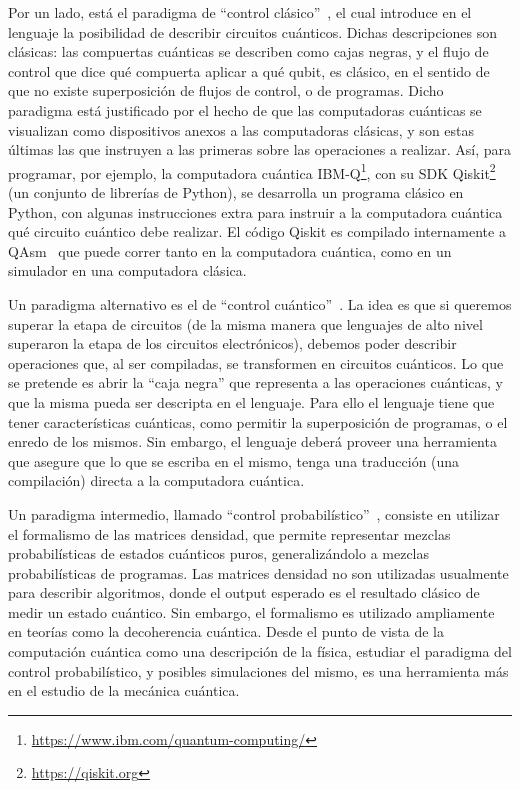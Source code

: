\documentclass[a4paper]{article}
\begin{document}
Por un lado, está el paradigma de ``control clásico''~\cite{SelingerMSCS04}, el
cual introduce en el lenguaje la posibilidad de describir circuitos cuánticos.
Dichas descripciones son clásicas: las compuertas cuánticas se describen como
cajas negras, y el flujo de control que dice qué compuerta aplicar a qué qubit,
es clásico, en el sentido de que no existe superposición de flujos de control, o
de programas. Dicho paradigma está justificado por el hecho de que las
computadoras cuánticas se visualizan como dispositivos anexos a las computadoras
clásicas, y son estas últimas las que instruyen a las primeras sobre las
operaciones a realizar. Así, para programar, por ejemplo, la computadora
cuántica IBM-Q\footnote{\url{https://www.ibm.com/quantum-computing/}}, con su
SDK Qiskit\footnote{\url{https://qiskit.org}} (un conjunto de librerías de
Python), se desarrolla un programa clásico en Python, con algunas instrucciones
extra para instruir a la computadora cuántica qué circuito cuántico debe
realizar. El código Qiskit es compilado internamente a QAsm~\cite{qiskit_specifications._2018} que puede correr tanto en la computadora cuántica, como
en un simulador en una computadora clásica.

Un paradigma alternativo es el de ``control
cuántico''~\cite{AltenkirchGrattageLICS05,ArrighiDowekLMCS17,DiazcaroGuillermoMiquelValironLICS19}.
La idea es que si queremos superar la etapa de circuitos (de la misma manera que
lenguajes de alto nivel superaron la etapa de los circuitos electrónicos),
debemos poder describir operaciones que, al ser compiladas, se transformen en
circuitos cuánticos. Lo que se pretende es abrir la ``caja negra'' que
representa a las operaciones cuánticas, y que la misma pueda ser descripta en el
lenguaje. Para ello el lenguaje tiene que tener características cuánticas, como
permitir la superposición de programas, o el enredo de los mismos. Sin embargo,
el lenguaje deberá proveer una herramienta que asegure que lo que se escriba en
el mismo, tenga una traducción (una compilación) directa a la computadora
cuántica.

Un paradigma intermedio, llamado ``control
probabilístico''~\cite{DiazcaroAPLAS17}, consiste en utilizar el formalismo de
las matrices densidad, que permite representar mezclas probabilísticas de
estados cuánticos puros, generalizándolo a mezclas probabilísticas de programas.
Las matrices densidad no son utilizadas usualmente para describir algoritmos,
donde el output esperado es el resultado clásico de medir un estado cuántico.
Sin embargo, el formalismo es utilizado ampliamente en teorías como la
decoherencia cuántica. Desde el punto de vista de la computación cuántica como
una descripción de la física, estudiar el paradigma del control probabilístico,
y posibles simulaciones del mismo, es una herramienta más en el estudio de la
mecánica cuántica.
\end{document}

